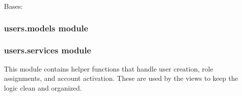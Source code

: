\documentclass[a4paper,11pt,spanish]{sphinxmanual}
\begin{document}
\begin{fulllineitems}
\label{\detokenize{api/users/users.apps:users.apps.UsersConfig}}
\pysigstartsignatures
\pysiglinewithargsret
{}
{\sphinxparamcomma {}}
{}
\pysigstopsignatures
\sphinxAtStartPar
Bases: 

\begin{fulllineitems}
\label{\detokenize{api/users/users.apps:users.apps.UsersConfig.default_auto_field}}
\pysigstartsignatures
\pysigline
{}
\pysigstopsignatures
\end{fulllineitems}


\begin{fulllineitems}
\label{\detokenize{api/users/users.apps:users.apps.UsersConfig.name}}
\pysigstartsignatures
\pysigline
{}
\pysigstopsignatures
\end{fulllineitems}


\end{fulllineitems}


\sphinxstepscope


\subsubsection{users.models module}
\label{\detokenize{api/users/users.models:module-users.models}}\label{\detokenize{api/users/users.models:users-models-module}}\label{\detokenize{api/users/users.models::doc}}
\sphinxstepscope


\subsubsection{users.services module}
\label{\detokenize{api/users/users.services:module-users.services}}\label{\detokenize{api/users/users.services:users-services-module}}\label{\detokenize{api/users/users.services::doc}}
\sphinxAtStartPar
This module contains helper functions that handle user creation,
role assignments, and account activation. These are used by the
views to keep the logic clean and organized.
\end{document}

